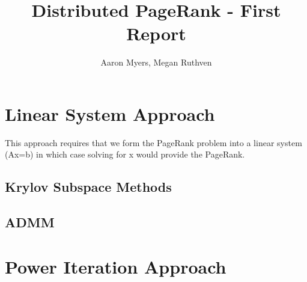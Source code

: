 \documentclass[a4paper,10pt]{article}
\title{Distributed PageRank - First Report}
\author{Aaron Myers, Megan Ruthven}
\begin{document}
\maketitle
\pagebreak
\section{Linear System Approach}
This approach requires that we form the PageRank problem into a linear system (Ax=b) in which case solving for x would provide the PageRank.


\subsection{Krylov Subspace Methods}



\subsection{ADMM}

\section{Power Iteration Approach}
\end{document}

